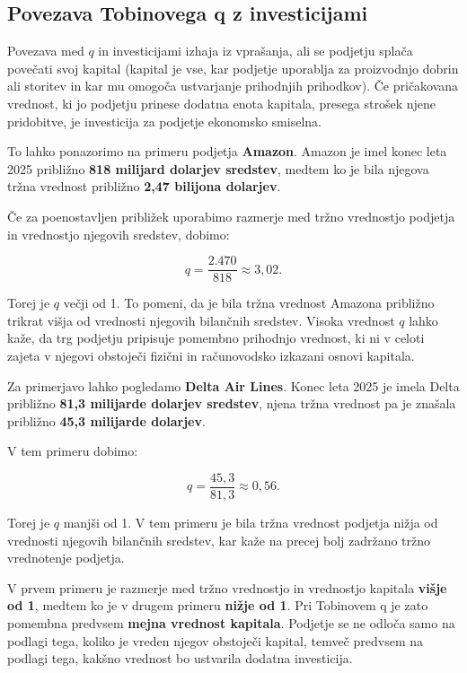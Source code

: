 \documentclass[12pt,a4paper]{article}
\begin{document}
\subsection{Povezava Tobinovega q z investicijami}


Povezava med $q$ in investicijami izhaja iz vprašanja, ali se podjetju splača povečati svoj kapital (kapital je vse, kar podjetje uporablja za proizvodnjo dobrin ali storitev in kar mu omogoča ustvarjanje prihodnjih prihodkov). Če pričakovana vrednost, ki jo podjetju prinese dodatna enota kapitala, presega strošek njene pridobitve, je investicija za podjetje ekonomsko smiselna.

To lahko ponazorimo na primeru podjetja \textbf{Amazon}. Amazon je imel konec leta 2025 približno \textbf{818 milijard dolarjev sredstev}, medtem ko je bila njegova tržna vrednost približno \textbf{2,47 bilijona dolarjev}.

Če za poenostavljen približek uporabimo razmerje med tržno vrednostjo podjetja in vrednostjo njegovih sredstev, dobimo:

\begin{equation}
q = \frac{2.470}{818} \approx 3,02.
\end{equation}

Torej je $q$ večji od 1. To pomeni, da je bila tržna vrednost Amazona približno trikrat višja od vrednosti njegovih bilančnih sredstev. Visoka vrednost $q$ lahko kaže, da trg podjetju pripisuje pomembno prihodnjo vrednost, ki ni v celoti zajeta v njegovi obstoječi fizični in računovodsko izkazani osnovi kapitala.

Za primerjavo lahko pogledamo \textbf{Delta Air Lines}. Konec leta 2025 je imela Delta približno \textbf{81,3 milijarde dolarjev sredstev}, njena tržna vrednost pa je znašala približno \textbf{45,3 milijarde dolarjev}.

V tem primeru dobimo:

\begin{equation}
q = \frac{45,3}{81,3} \approx 0,56.
\end{equation}

Torej je $q$ manjši od 1. V tem primeru je bila tržna vrednost podjetja nižja od vrednosti njegovih bilančnih sredstev, kar kaže na precej bolj zadržano tržno vrednotenje podjetja.

V prvem primeru je razmerje med tržno vrednostjo in vrednostjo kapitala \textbf{višje od 1}, medtem ko je v drugem primeru \textbf{nižje od 1}.
Pri Tobinovem q je zato pomembna predvsem \textbf{mejna vrednost kapitala}. Podjetje se ne odloča samo na podlagi tega,
koliko je vreden njegov obstoječi kapital, temveč predvsem na podlagi tega, kakšno vrednost bo ustvarila dodatna investicija.
\end{document}
